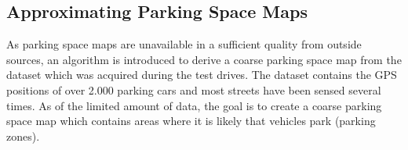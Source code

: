 



\subsection{Approximating Parking Space Maps}
\label{sec:approximating_parking_space_maps}

As parking space maps are unavailable in a sufficient quality from outside sources, an algorithm is introduced to derive a coarse parking space map from the dataset which was acquired during the test drives. The dataset contains the GPS positions of over 2.000 parking cars and most streets have been sensed several times. As of the limited amount of data, the goal is to create a coarse parking space map which contains areas where it is likely that vehicles park (parking zones). 

